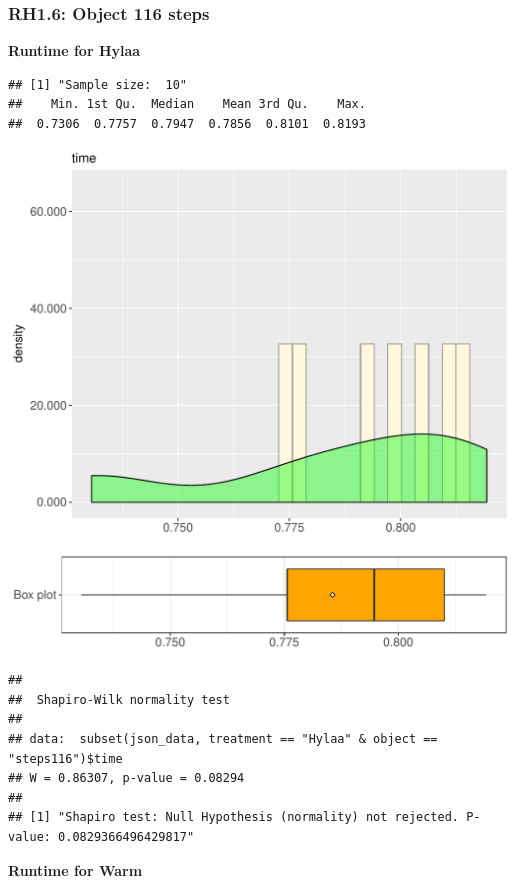 \documentclass{article}\usepackage[]{graphicx}\usepackage[]{color}
\makeatletter
\def\maxwidth{ %
  \ifdim\Gin@nat@width>\linewidth
    \linewidth
  \else
    \Gin@nat@width
  \fi
}
\newenvironment{kframe}{%
 \def\at@end@of@kframe{}%
 \ifinner\ifhmode%
  \def\at@end@of@kframe{\end{minipage}}%
  \begin{minipage}{\columnwidth}%
 \fi\fi%
 \def\FrameCommand##1{\hskip\@totalleftmargin \hskip-\fboxsep
 \colorbox{shadecolor}{##1}\hskip-\fboxsep
     \hskip-\linewidth \hskip-\@totalleftmargin \hskip\columnwidth}%
 \MakeFramed {\advance\hsize-\width
   \@totalleftmargin\z@ \linewidth\hsize
   \@setminipage}}%
 {\par\unskip\endMakeFramed%
 \at@end@of@kframe}
\newenvironment{knitrout}{}{} %
\makeatother
\begin{document}
\subsubsection{RH1.6: Object 116 steps}

 \textbf{Runtime for Hylaa}
\begin{knitrout}
\color{fgcolor}\begin{kframe}
\begin{verbatim}
## [1] "Sample size:  10"
##    Min. 1st Qu.  Median    Mean 3rd Qu.    Max. 
##  0.7306  0.7757  0.7947  0.7856  0.8101  0.8193
\end{verbatim}
\end{kframe}
\includegraphics[width=\maxwidth]{figure/RH1_Hylaa_steps116-1} 
\begin{kframe}\begin{verbatim}
## 
## 	Shapiro-Wilk normality test
## 
## data:  subset(json_data, treatment == "Hylaa" & object == "steps116")$time
## W = 0.86307, p-value = 0.08294
## 
## [1] "Shapiro test: Null Hypothesis (normality) not rejected. P-value: 0.0829366496429817"
\end{verbatim}
\end{kframe}
\end{knitrout}
 \textbf{Runtime for Warm}
\end{document}
